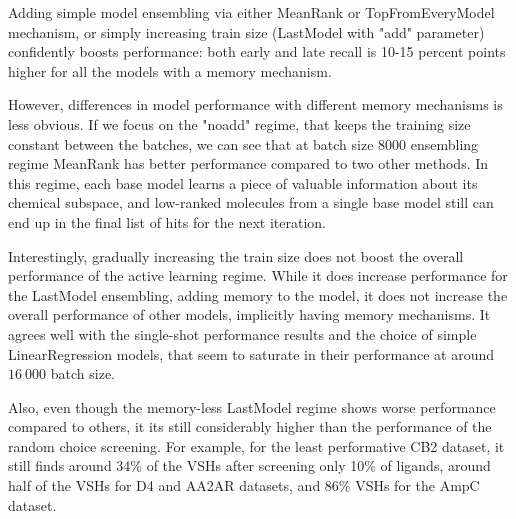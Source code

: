 Adding simple model ensembling via either MeanRank or TopFromEveryModel mechanism, or simply increasing train size (LastModel with "add" parameter) confidently boosts performance: both early and late recall is 10-15 percent points higher for all the models with a memory mechanism.

However, differences in model performance with different memory mechanisms is less obvious. If we focus on the "noadd" regime, that keeps the training size constant between the batches, we can see that at batch size 8000  ensembling regime MeanRank has better performance compared to two other methods. In this regime, each base model learns a piece of valuable information about its chemical subspace, and low-ranked molecules from a single base model still can end up in the final list of hits for the next iteration.

Interestingly, gradually increasing the train size does not boost the overall performance of the active learning regime. While it does increase performance for the LastModel ensembling, adding memory to the model, it does not increase the overall performance of other models, implicitly having memory mechanisms. It agrees well with the single-shot performance results and the choice of simple LinearRegression models, that seem to saturate in their performance at around $16\ 000$ batch size.

Also, even though the memory-less LastModel regime shows worse performance compared to others, it its still considerably higher than the performance of the random choice screening. For example, for the least performative CB2 dataset, it still finds around 34\% of the VSHs after screening only 10\% of ligands, around half of the VSHs for D4 and AA2AR datasets, and 86\% VSHs for the AmpC dataset.



